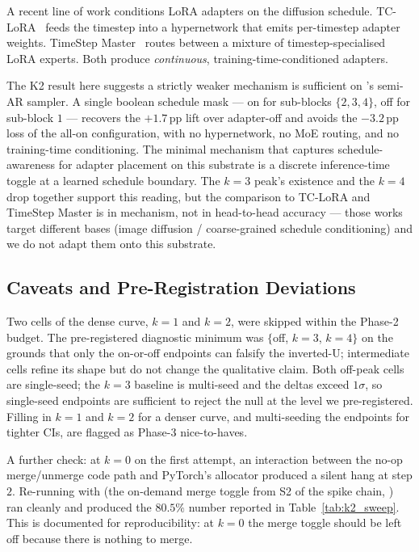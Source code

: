A recent line of work conditions LoRA adapters on the diffusion
schedule.  TC-LoRA~\citep{tclora2025} feeds the timestep into a
hypernetwork that emits per-timestep adapter weights.  TimeStep
Master~\citep{timestepmaster2025} routes between a mixture of
timestep-specialised LoRA experts.  Both produce \emph{continuous},
training-time-conditioned adapters.

The K2 result here suggests a strictly weaker mechanism is sufficient
on \LLaDA{}'s semi-AR sampler.  A single boolean schedule mask --- on
for sub-blocks $\{2, 3, 4\}$, off for sub-block $1$ --- recovers the
$+1.7$\,pp lift over adapter-off and avoids the $-3.2$\,pp loss of
the all-on configuration, with no hypernetwork, no MoE routing, and
no training-time conditioning.  The minimal mechanism that captures
schedule-awareness for adapter placement on this substrate is a
discrete inference-time toggle at a learned schedule boundary.  The
$k{=}3$ peak's existence and the $k{=}4$ drop together support this
reading, but the comparison to TC-LoRA and TimeStep Master is in
mechanism, not in head-to-head accuracy --- those works target
different bases (image diffusion / coarse-grained schedule
conditioning) and we do not adapt them onto this substrate.

\subsection{Caveats and Pre-Registration Deviations}
\label{subsec:k2_caveats}

Two cells of the dense curve, $k{=}1$ and $k{=}2$, were skipped within
the Phase-2 budget.  The pre-registered diagnostic minimum was
$\{$off, $k{=}3$, $k{=}4\}$ on the grounds that only the on-or-off
endpoints can falsify the inverted-U; intermediate cells refine its
shape but do not change the qualitative claim.  Both off-peak cells
are single-seed; the $k{=}3$ baseline is multi-seed and the deltas
exceed $1\sigma$, so single-seed endpoints are sufficient to reject
the null at the level we pre-registered.  Filling in $k{=}1$ and
$k{=}2$ for a denser curve, and multi-seeding the endpoints for
tighter CIs, are flagged as Phase-3 nice-to-haves.

A further check: at $k{=}0$ on the first attempt, an interaction
between the no-op merge/unmerge code path and PyTorch's
 allocator produced a silent
hang at step $2$.  Re-running with  (the
on-demand merge toggle from S2 of the spike chain,
) ran cleanly and produced the $80.5\%$
number reported in Table~\ref{tab:k2_sweep}.  This is documented for
reproducibility: at $k{=}0$ the merge toggle should be left off
because there is nothing to merge.

